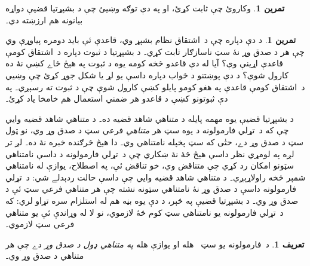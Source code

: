 \documentclass[12pt,a4paper,oneside]{report}
\newcommand{\olfileid}[3]{\gdef\pspart{#1}\gdef\pschapter{#2}\gdef\pssection{#3}}
\gdef\pspart{#2}\gdef\pschapter{#3}\gdef\pssection{}%
\theoremstyle{definition}
\newtheorem{defn}[thm]{تعريف}
\newtheorem{prob}[thm]{تمرين}
\begin{document}
\label{olpseg:OLP-0134-B012:start}
\begin{prob}
 وکاروئ چې
 ثابت کړئ، او په دې توګه
وښيئ چې د بشپړتيا قضيې دواړه بيانونه هم ارزښته دي۔
\end{prob}
\label{olpseg:OLP-0134-B012:end}



\label{olpseg:OLP-0134-B014:start}
\begin{prob}
د دې دپاره چې د~اشتقاق نظام بشپړ وي، قاعدې ئې بايد دومره
پياوړې وي چې هر د صدق وړ نۀ سټ ناسازګار ثابت کړي۔ د بشپړتيا د ثبوت
دپاره د~اشتقاق کومې قاعدې اړينې وې؟ آيا له دې قاعدو څخه
کومه يوه د ثبوت په هېڅ ځاے کښې نۀ ده کارول شوې؟ د دې پوښتنو د ځواب
دپاره داسې يو لړ يا شکل جوړ کړئ چې وښيي د~اشتقاق کومې
قاعدې په هغو کومو پايلو کښې کارول شوې چې د
 ثبوت ته رسېږي۔ په دې ثبوتونو
کښې د قاعدو هر ضمني استعمال هم خامخا ياد کړئ۔
\end{prob}
\label{olpseg:OLP-0134-B014:end}

\label{olpseg:OLP-0135-B004:start}
\olfileid{fol}{com}{com}
\label{olpseg:OLP-0135-B004:end}

\label{olpseg:OLP-0135-B005:start}
\label{olpseg:OLP-0135-B005:end}

\label{olpseg:OLP-0135-B006:start}
د بشپړتيا قضيې يوه مهمه پايله د متناهي شاهد قضيه ده۔ د متناهي
شاهد قضيه وايي چې که د~تړلي فارمولونه د يوه سټ هر
\emph{متناهي} فرعي سټ د صدق وړ وي، نو ټول سټ د صدق وړ دے، حتٰی
که سټ پخپله نامتناهي وي۔ دا هېڅ څرګنده خبره نۀ ده۔ لږ تر لږه په
لومړي نظر داسې هېڅ څۀ نۀ ښکاري چې د~تړلي فارمولونه د داسې نامتناهي
سټونو امکان رد کړي چې متناقض وي، خو تناقض ئې، په اصطلاح، يوازې له
نامتناهي شمېر څخه راولاړېږي۔ د متناهي شاهد قضيه وايي چې داسې حالت
ردېدلے شي: د~تړلي فارمولونه داسې د صدق وړ نۀ نامتناهي سټونه نشته
چې هر متناهي فرعي سټ ئې د صدق وړ وي۔ د بشپړتيا قضيې په څېر، د دې
يوه بڼه هم له استلزام سره تړاو لري: که د~تړلي فارمولونه يو نامتناهي
سټ کوم څۀ لازموي، نو لا له وړاندې ئې يو متناهي فرعي سټ لازموي۔
\label{olpseg:OLP-0135-B006:end}

\label{olpseg:OLP-0135-B007:start}
\begin{defn}
  د~فارمولونه يو سټ~\LR{$\Gamma$} هله او يوازې هله
  \emph{په متناهي ډول د صدق وړ} دے چې هر متناهي
  \LR{$\Gamma_0 \subseteq \Gamma$} د صدق وړ وي۔
\end{defn}
\label{olpseg:OLP-0135-B007:end}
\end{document}

